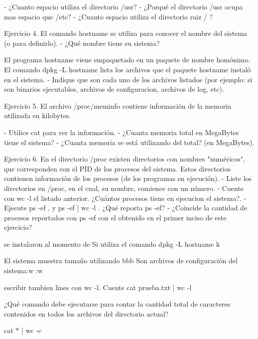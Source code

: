 \documentclass[12pt]{article}
\begin{document}
- ¿Cuanto espacio utiliza el directorio /usr?
- ¿Porqué el directorio /usr ocupa mas espacio que /etc?
- ¿Cuanto espacio utiliza el directorio raiz / ?


Ejercicio 4.
El comando hostname se utiliza para conocer el nombre del sistema (o para definirlo).
- ¿Qué nombre tiene su sistema?

El programa hostname viene empaquetado en un paquete de nombre homónimo.
El comando dpkg -L hostname  lista los archivos que el paquete hostname instaló en el sistema.
- Indique que son cada uno de los archivos listados (por ejemplo: si son binarios ejecutables, archivos de configuracion, archivos de log, etc).



Ejercicio 5.
El archivo /proc/meminfo contiene información de la memoria utilizada en kilobytes.

- Utilice cat para ver la información.
- ¿Cuanta memoria total en MegaBytes tiene el sistema?
- ¿Cuanta memoria se está utilizando del total? (en MegaBytes).


Ejercicio 6.
En el directorio /proc existen directorios con nombres "numéricos", que corresponden con el PID de los procesos del sistema.
Estos directorios contienen información de los procesos (de los programas en ejecución).
- Liste los directorios en /proc, en el cual, su nombre, comience con un número.
- Cuente con wc -l el listado anterior. ¿Cuántos procesos tiene en ejecucion el sistema?.
- Ejecute ps -ef , y ps -ef | wc -l . ¿Qué reporta ps -ef?
- ¿Coincide la cantidad de procesos reportados con ps -ef con el obtenido en el primer inciso de este ejercicio?




se instalaron al momento de 
Si utiliza el comando dpkg -L hostname 
k

El sistema muestra 
tamaño utilizando bbb
Son archivos de configuración del sistema:w
:w


escribir 
 tambien lines con wc -l.
Cuente 
cat prueba.txt | wc -l 

¿Qué comando debe ejecutarse para contar la cantidad total de caracteres contenidos en todos los archivos del directorio actual?

cat * | wc -c
\end{document}
